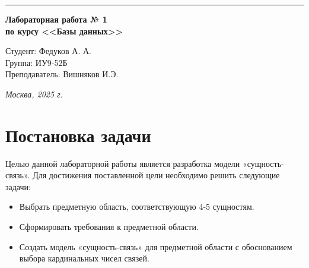 \documentclass[a4paper, 14pt]{extarticle}
\begin{document}
\begin{titlepage}
\vspace*{-16pt}
\hspace{30pt}\rule{0.866\textwidth}{0.4pt}
  
\vspace{11em}

\begin{center}
\Large {\bf Лабораторная работа № 1} \\ 
\large {\bf по курсу <<Базы данных>>} \\

\end{center}\normalsize

\vspace{8em}


\begin{flushright}
 \begin{minipage}{0.5\linewidth}
      {Студент: Федуков А. А. \hspace*{15pt}\\ 
      Группа: ИУ9-52Б \\ 
      Преподаватель: Вишняков И.Э. \hspace*{15pt}}
  \end{minipage}
\end{flushright}
\bigskip
\vfill
\begin{center}
\textsl{Москва, 2025 г.}
\end{center}
\end{titlepage}

\renewcommand{\ttdefault}{pcr}

\setlength{\tabcolsep}{3pt}
\newpage
\setcounter{page}{2}

{
  \hypersetup{linkcolor=black}
  \tableofcontents
}


\section*{Постановка задачи}\label{Sect::goal}
Целью данной лабораторной работы является разработка модели «сущность-связь».
Для достижения поставленной цели необходимо решить следующие задачи:
\begin{itemize}
    \item  Выбрать предметную область, соответствующую 4-5 сущностям. 
    \item  Сформировать требования к предметной области. 
    \item  Создать модель «сущность-связь» для предметной области с обоснованием выбора кардинальных чисел связей.
\end{itemize}
\end{document}
